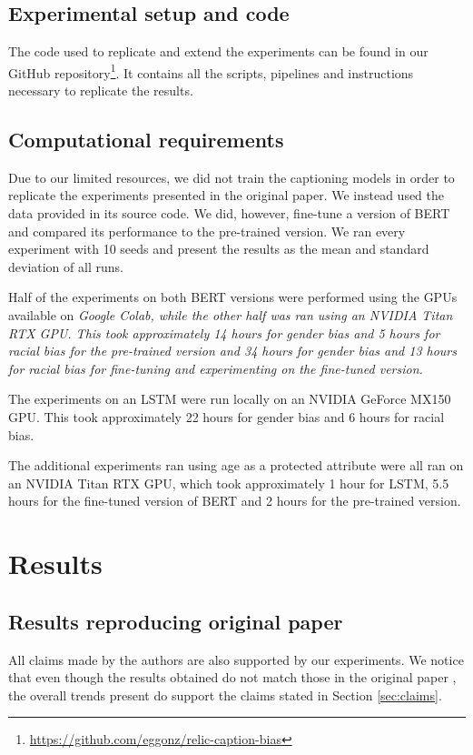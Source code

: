 \subsection{Experimental setup and code}
\label{sec:code}

The code used to replicate and extend the experiments can be found in our GitHub repository\footnote{
\url{https://github.com/eggonz/relic-caption-bias}}. It contains all the scripts, pipelines and instructions necessary to replicate the results.

\subsection{Computational requirements}

Due to our limited resources, we did not train the captioning models in order to replicate the experiments presented in the original paper. We instead used the data provided in its source code. We did, however, fine-tune a version of BERT \cite{BERT} and compared its performance to the pre-trained version. We ran every experiment with 10 seeds and present the results as the mean and standard deviation of all runs.

Half of the experiments on both BERT versions were performed using the GPUs available on \it Google Colab\rm, while the other half was ran using an NVIDIA Titan RTX GPU. This took approximately 14 hours for gender bias and 5 hours for racial bias for the pre-trained version and  34 hours for gender bias and 13 hours for racial bias for fine-tuning and experimenting on the fine-tuned version. 

The experiments on an LSTM were run locally on an NVIDIA GeForce MX150 GPU. This took approximately 22 hours for gender bias and 6 hours for racial bias.

The additional experiments ran using age as a protected attribute were all ran on an NVIDIA Titan RTX GPU, which took approximately 1 hour for LSTM, 5.5 hours for the fine-tuned version of BERT and 2 hours for the pre-trained version.


\section{Results}
\label{sec:results}

\subsection{Results reproducing original paper}
\label{sec:results-op}
All claims made by the authors are also supported by our experiments. We notice that even though the results obtained do not match those in the original paper \cite{Hirota2022}, the overall trends present do support the claims stated in Section \ref{sec:claims}.

